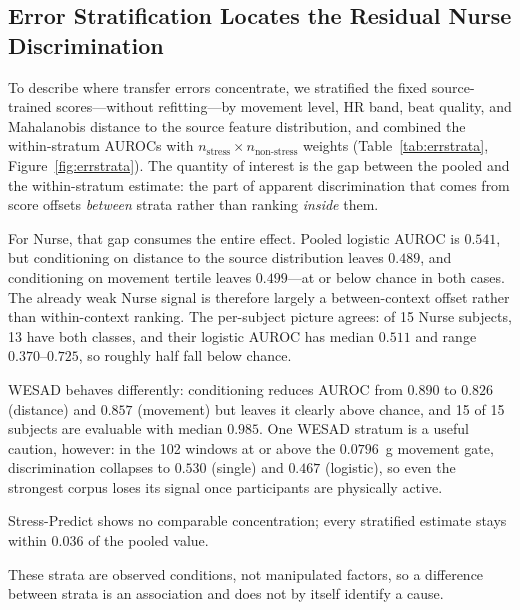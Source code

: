 \documentclass[healthcare,article,submit,moreauthors,pdftex]{Definitions/mdpi}
\begin{document}
\subsection{Error Stratification Locates the Residual Nurse Discrimination}
\label{sec:errstrata}

To describe where transfer errors concentrate, we stratified the fixed
source-trained scores---without refitting---by movement level, HR band, beat
quality, and Mahalanobis distance to the source feature distribution, and
combined the within-stratum AUROCs with $n_{\text{stress}} \times
n_{\text{non-stress}}$ weights (Table~\ref{tab:errstrata},
Figure~\ref{fig:errstrata}). The quantity of interest is the gap between the
pooled and the within-stratum estimate: the part of apparent discrimination that
comes from score offsets \emph{between} strata rather than ranking \emph{inside}
them.

For Nurse, that gap consumes the entire effect. Pooled logistic AUROC is $0.541$,
but conditioning on distance to the source distribution leaves $0.489$, and
conditioning on movement tertile leaves $0.499$---at or below chance in both
cases. The already weak Nurse signal is therefore largely a between-context
offset rather than within-context ranking. The per-subject picture agrees:
of 15 Nurse subjects, 13 have both classes, and their logistic AUROC has median
$0.511$ and range $0.370$--$0.725$, so roughly half fall below chance.

WESAD behaves differently: conditioning reduces AUROC from $0.890$ to $0.826$
(distance) and $0.857$ (movement) but leaves it clearly above chance, and 15 of
15 subjects are evaluable with median $0.985$. One WESAD stratum is a useful
caution, however: in the 102 windows at or above the $0.0796$~g movement gate,
discrimination collapses to $0.530$ (single) and $0.467$ (logistic), so even the
strongest corpus loses its signal once participants are physically active.

Stress-Predict shows no comparable concentration; every stratified estimate stays
within $0.036$ of the pooled value.

These strata are observed conditions, not manipulated factors, so a difference
between strata is an association and does not by itself identify a cause.
\end{document}
